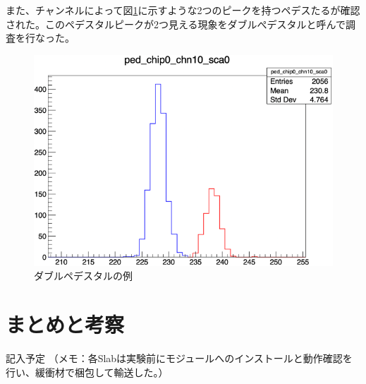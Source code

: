 また、チャンネルによって図\ref{dp}に示すような2つのピークを持つペデスたるが確認された。このペデスタルピークが2つ見える現象をダブルぺデスタルと呼んで調査を行なった。
\begin{figure}[H]
\begin{center}
 \includegraphics[keepaspectratio, scale=0.5]
 	{Figure/Beamtest/dp.png}
 		\caption{ダブルペデスタルの例}
		\label{dp}
\end{center}
\end{figure}
\section{まとめと考察}
記入予定
（メモ：各Slabは実験前にモジュールへのインストールと動作確認を行い、緩衝材で梱包して輸送した。）